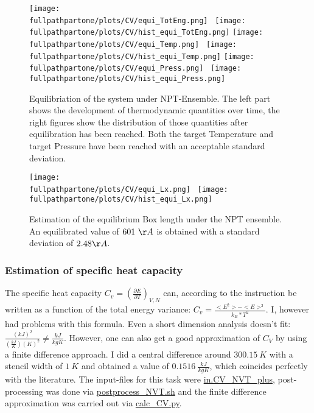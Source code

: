 \documentclass[10pt,a4paper]{report}
\def \pathpartone {../../1_three-dimensional_atomic_system}
\def \fullpathpartone {/home/lukas/Desktop/project/independence/atomistic_modeling/exam/1_three-dimensional_atomic_system}
\begin{document}
\begin{center}
\begin{figure}[h]
\texttt{[image: \\fullpathpartone/plots/CV/equi\_TotEng.png]}~
\texttt{[image: \\fullpathpartone/plots/CV/hist\_equi\_TotEng.png]}
\texttt{[image: \\fullpathpartone/plots/CV/equi\_Temp.png]}~
\texttt{[image: \\fullpathpartone/plots/CV/hist\_equi\_Temp.png]}
\texttt{[image: \\fullpathpartone/plots/CV/equi\_Press.png]}~
\texttt{[image: \\fullpathpartone/plots/CV/hist\_equi\_Press.png]}
\caption[aaa]{Equilibriation of the system under NPT-Ensemble. The left part shows the development of thermodynamic quantities over time, the right figures show the distribution of those quantities after equilibration has been reached. Both the target Temperature and target Pressure have been reached with an acceptable standard deviation.}
\label{fig:p1_CV_equi_NPT}
\end{figure}
\end{center}

\begin{center}
\begin{figure}[h]
\texttt{[image: \\fullpathpartone/plots/CV/equi\_Lx.png]}~
\texttt{[image: \\fullpathpartone/plots/CV/hist\_equi\_Lx.png]}
\caption[aaa]{Estimation of the equilibrium Box length under the NPT ensemble. An equilibrated  value of $601~\AA$ is obtained with a standard deviation of $2.48 \AA$.}
\label{fig:p1_CV_equi_NPT_lx}
\end{figure}
\end{center}


\subsubsection{Estimation of specific heat capacity}
The specific heat capacity $C_v=\left(\frac{\partial E}{\partial T}\right)_{V,N}$ can, according to the instruction be written as a function of the total energy variance: $C_v=\frac{<E^2>-<E>^2}{k_B*T^2}$. I, however had problems with this formula. Even a short dimension analysis doesn't fit: $\frac{ {(kJ)}^2     }{ (\frac{kJ}{K}) {(K)}^2 } \neq \frac{kJ}{kg K}$.
However, one can also get a good approximation of $C_V$ by using a finite difference approach.
I did a central difference around $300.15~K$ with a stencil width of $1~K$ and obtained a value of $0.1516~\frac{kJ}{kg K}$, which coincides perfectly with the literature.
The input-files for this task were \href{\pathpartone/in.CV_NVT_plus}{in.CV\_NVT\_plus}, post-processing was done via \href{\pathpartone/postprocess_NVT.sh}{postprocess\_NVT.sh} and the finite difference approximation was carried out via \href{\pathpartone/calc_CV.py}{calc\_CV.py}.
\end{document}
